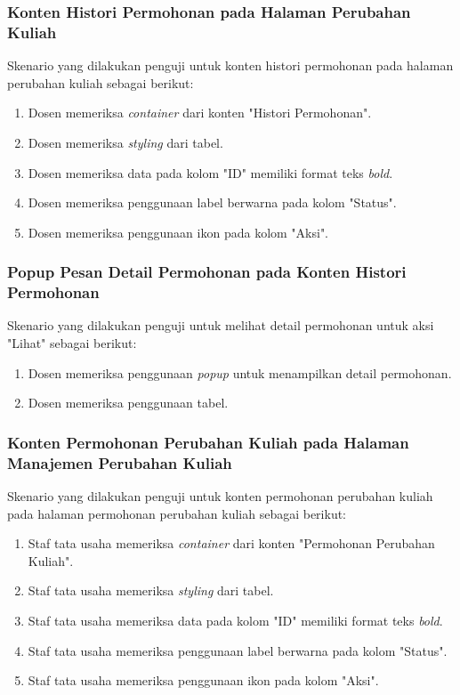 \subsubsection{Konten Histori Permohonan pada Halaman Perubahan Kuliah}
Skenario yang dilakukan penguji untuk konten histori permohonan pada halaman perubahan kuliah sebagai berikut:
\begin{enumerate}
	\item Dosen memeriksa \textit{container} dari konten "Histori Permohonan".
	\item Dosen memeriksa \textit{styling} dari tabel.	
	\item Dosen memeriksa data pada kolom "ID" memiliki format teks \textit{bold}.
	\item Dosen memeriksa penggunaan label berwarna pada kolom "Status".			
	\item Dosen memeriksa penggunaan ikon pada kolom "Aksi".
\end{enumerate}

\subsubsection{Popup Pesan Detail Permohonan pada Konten Histori Permohonan}
Skenario yang dilakukan penguji untuk melihat detail permohonan untuk aksi "Lihat" sebagai berikut:
\begin{enumerate}
	\item Dosen memeriksa penggunaan \textit{popup} untuk menampilkan detail permohonan.
	\item Dosen memeriksa penggunaan tabel.	
\end{enumerate}

\subsubsection{Konten Permohonan Perubahan Kuliah pada Halaman Manajemen Perubahan Kuliah}
Skenario yang dilakukan penguji untuk konten permohonan perubahan kuliah pada halaman permohonan perubahan kuliah sebagai berikut:
\begin{enumerate}
	\item Staf tata usaha memeriksa \textit{container} dari konten "Permohonan Perubahan Kuliah".
	\item Staf tata usaha memeriksa \textit{styling} dari tabel.	
	\item Staf tata usaha memeriksa data pada kolom "ID" memiliki format teks \textit{bold}.
	\item Staf tata usaha memeriksa penggunaan label berwarna pada kolom "Status".			
	\item Staf tata usaha memeriksa penggunaan ikon pada kolom "Aksi".
\end{enumerate}

